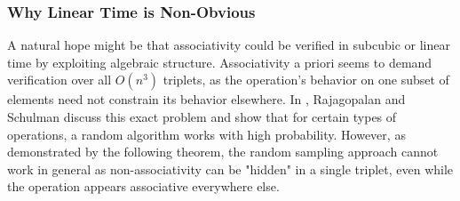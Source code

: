 \documentclass[sigconf]{acmart}
\begin{document}
\subsubsection*{Why Linear Time is Non-Obvious}
A natural hope might be that associativity could be verified in subcubic or linear time by exploiting algebraic structure. Associativity a priori seems to demand verification over all \(O(n^3)\) triplets, as the operation's behavior on one subset of elements need not constrain its behavior elsewhere. In \cite{verificationOfIdentities}, Rajagopalan and Schulman discuss this exact problem and show that for certain types of operations, a random algorithm works with high probability. However, as demonstrated by the following theorem, the random sampling approach cannot work in general as non-associativity can be "hidden" in a single triplet, even while the operation appears associative everywhere else.
\end{document}
